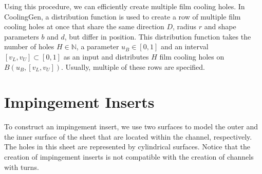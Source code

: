 \documentclass[a4paper, 11pt]{report}
\theoremstyle{definition}
\begin{document}
	Using this procedure, we can efficiently create multiple film cooling holes. In CoolingGen, a distribution function is used to create a row of multiple film cooling holes at once that share the same direction $D$, radius $r$ and shape parameters $b$ and $d$, but differ in position. This distribution function takes the number of holes $H \in \mathbb{N}$, a parameter $u_B \in [0,1]$ and an interval $[v_L, v_U] \subset [0,1]$ as an input and distributes $H$ film cooling holes on $B(u_B, [v_L, v_U])$. Usually, multiple of these rows are specified.

\section{Impingement Inserts}
	To construct an impingement insert, we use two surfaces to model the outer and the inner surface of the sheet that are located within the channel, respectively. The holes in this sheet are represented by cylindrical surfaces. Notice that the creation of impingement inserts is not compatible with the creation of channels with turns.
\end{document}
